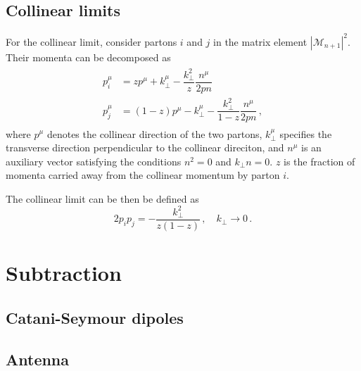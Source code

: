 \documentclass[main.tex]{subfiles}
\begin{document}
\subsection{Collinear limits}\label{sec:me_collinear}
    For the collinear limit, consider partons $i$ and
    $j$ in the matrix element $|\mathcal{M}_{n+1}|^{2}$.
    Their momenta can be decomposed as
    \begin{align}\label{eqn:collinear_momenta}
        \begin{split}
        p_{i}^{\mu} &= z p^{\mu} + k_{\perp}^{\mu} - \dfrac{k_{\perp}^{2}}{z} \dfrac{n^{\mu}}{2 p n} \, \\
        p_{j}^{\mu} &= (1-z) p^{\mu} - k_{\perp}^{\mu} - \dfrac{k_{\perp}^{2}}{1-z}\dfrac{n^{\mu}}{2 p n} \, , 
        \end{split}
    \end{align}
    where $p^{\mu}$ denotes the collinear direction
    of the two partons, $k_{\perp}^{\mu}$ specifies
    the transverse direction perpendicular to the
    collinear direciton, and $n^{\mu}$ is an auxiliary
    vector satisfying the conditions $n^{2} = 0$ and $k_{\perp} n = 0$.
    $z$ is the fraction of momenta carried away from
    the collinear momentum by parton $i$.
    
    The collinear limit can be then be defined as
    \begin{equation}\label{eqn:collinear limit}
        2 p_{i} p_{j} = - \dfrac{k_{\perp}^{2}}{z(1-z)} \, , \quad k_{\perp} \rightarrow 0 \, .
    \end{equation}
\section{Subtraction}\label{sec:subtraction}
\subsection{Catani-Seymour dipoles}\label{sec:CS_dipoles}
\subsection{Antenna}\label{sec:antenna_functions}
\end{document}
